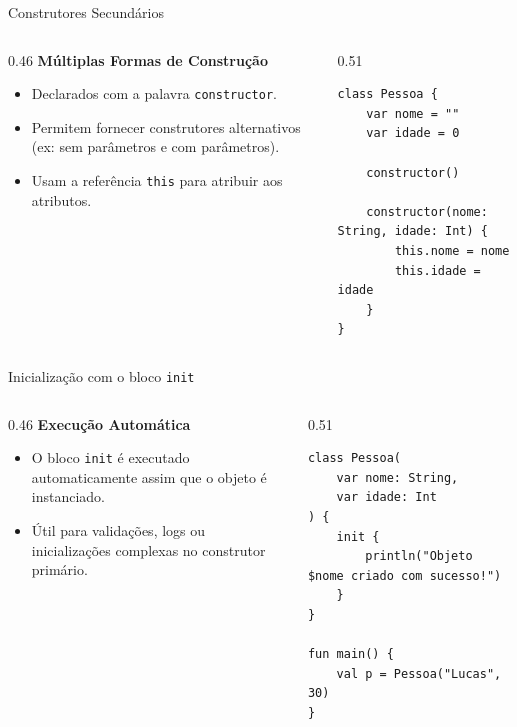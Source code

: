 \documentclass[aspectratio=169]{beamer}
\begin{document}
\begin{frame}[fragile]{Construtores Secundários}
  \begin{columns}[T]
    \begin{column}{0.46\textwidth}
      \textbf{Múltiplas Formas de Construção}
      \vspace{0.3em}
      \begin{itemize}\small
        \item Declarados com a palavra \texttt{constructor}.
        \item Permitem fornecer construtores alternativos (ex: sem parâmetros e com parâmetros).
        \item Usam a referência \texttt{this} para atribuir aos atributos.
      \end{itemize}
    \end{column}
    \begin{column}{0.51\textwidth}
\begin{lstlisting}[style=KotlinStyle]
class Pessoa {
    var nome = ""
    var idade = 0

    constructor()

    constructor(nome: String, idade: Int) {
        this.nome = nome
        this.idade = idade
    }
}
\end{lstlisting}
    \end{column}
  \end{columns}
\end{frame}

\begin{frame}[fragile]{Inicialização com o bloco \texttt{init}}
  \begin{columns}[T]
    \begin{column}{0.46\textwidth}
      \textbf{Execução Automática}
      \vspace{0.3em}
      \begin{itemize}\small
        \item O bloco \texttt{init} é executado automaticamente assim que o objeto é instanciado.
        \item Útil para validações, logs ou inicializações complexas no construtor primário.
      \end{itemize}
    \end{column}
    \begin{column}{0.51\textwidth}
\begin{lstlisting}[style=KotlinStyle]
class Pessoa(
    var nome: String,
    var idade: Int
) {
    init {
        println("Objeto $nome criado com sucesso!")
    }
}

fun main() {
    val p = Pessoa("Lucas", 30)
}
\end{lstlisting}
    \end{column}
  \end{columns}
\end{frame}
\end{document}
